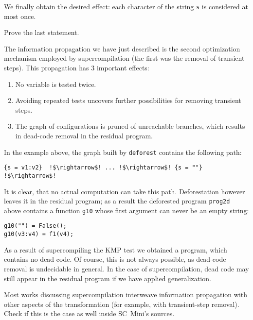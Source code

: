 We finally obtain the desired effect: each character of the string \texttt{s}
is considered at most once.

\begin{exercise}
Prove the last statement.
\end{exercise}

The information propagation we have just described is the second optimization mechanism 
employed by supercompilation (the first was the removal of transient steps).
This propagation has 3 important effects:
\begin{enumerate}
  \item No variable is tested twice.
  \item Avoiding repeated tests uncovers further possibilities for removing transient steps.
  \item The graph of configurations is pruned of unreachable branches, which results in dead-code 
  removal in the residual program.
\end{enumerate}
In the example above, the graph built by \texttt{deforest} contains the following path:
\begin{lstlisting}[language=sll,escapechar=!]
{s = v1:v2}  !$\rightarrow$! ... !$\rightarrow$! {s = ""} !$\rightarrow$!
\end{lstlisting}
It is clear, that no actual computation can take this path. 
Deforestation however leaves it in the residual program;
as a result the deforested program \texttt{prog2d} above contains a function
\texttt{g10} whose first argument can never be an empty string:
\begin{lstlisting}[language=sll]
g10("") = False();
g10(v3:v4) = f1(v4);
\end{lstlisting}

As a result of supercompiling the KMP test we obtained a program, which contains no dead code.
Of course, this is not always possible, as dead-code removal is undecidable in general.
In the case of supercompilation, dead code may still appear in the residual program
if we have applied generalization.

\begin{exercise}
Most works discussing supercompilation interweave information propagation with other
aspects of the transformation (for example, with transient-step removal).
Check if this is the case as well inside SC~Mini's sources.
\end{exercise}


